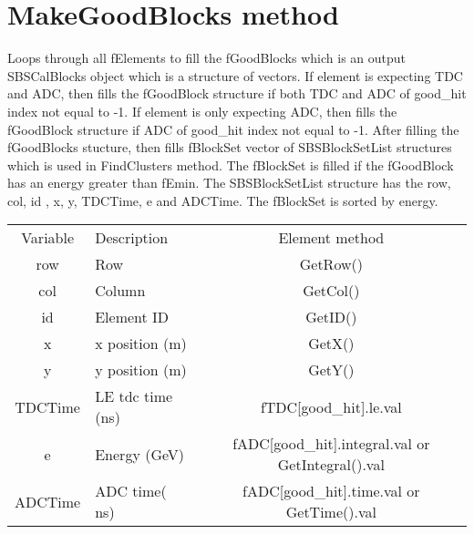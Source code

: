 \documentclass[11pt]{article}
\begin{document}
\section{MakeGoodBlocks method}
Loops through all fElements to fill the fGoodBlocks which is an
output SBSCalBlocks object which is a structure of vectors. If element is expecting TDC and ADC,
then fills the fGoodBlock structure if both TDC and ADC of good\_hit index not equal to -1.
If element is only expecting ADC, then fills the fGoodBlock structure if ADC of good\_hit index not equal to -1.
After filling the fGoodBlocks stucture, then fills fBlockSet vector of SBSBlockSetList structures which
is used in FindClusters method. The fBlockSet is filled if the fGoodBlock has an energy greater than fEmin.
The  SBSBlockSetList structure has the row, col, id , x, y, TDCTime, e and ADCTime.
The fBlockSet is sorted by energy.
\begin{table}[h]
	\begin{center}
		\begin{tabularx}{\textwidth}{|c|X|c|}
			\hline 
			Variable	& Description &  Element method\\ 
			row & Row & GetRow() \\
			\hline
			col & Column & GetCol() \\
			\hline	
		  id & Element ID & GetID() \\
		  \hline
		  x & x position (m) & GetX() \\
		  \hline
		  y & y position (m) & GetY() \\
		  \hline
		   TDCTime & LE tdc time (ns) & fTDC[good\_hit].le.val \\
		   \hline
		   e  & Energy (GeV) & fADC[good\_hit].integral.val or GetIntegral().val \\
		   \hline
		   ADCTime & ADC time( ns) & fADC[good\_hit].time.val or GetTime().val \\
		   \hline
\end{tabularx} 
\end{center}
\end{table}
\end{document}
